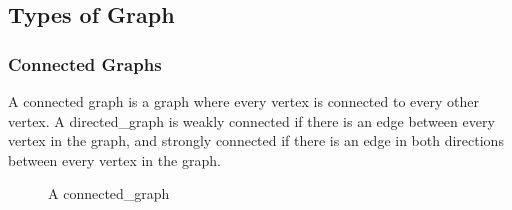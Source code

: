     \subsection{Types of Graph}
        \subsubsection{Connected Graphs}
            A connected \gls{graph} is a \gls{graph} where every \gls{vertex} is connected to every other \gls{vertex}.
            A \gls{directed_graph} is weakly connected if there is an \gls{edge} between every \gls{vertex} in the \gls{graph}, and strongly connected if there is an \gls{edge} in both directions between every \gls{vertex} in the \gls{graph}.

            \begin{figure}
                \centering
                \caption{A \gls{connected_graph}}
            \end{figure}

